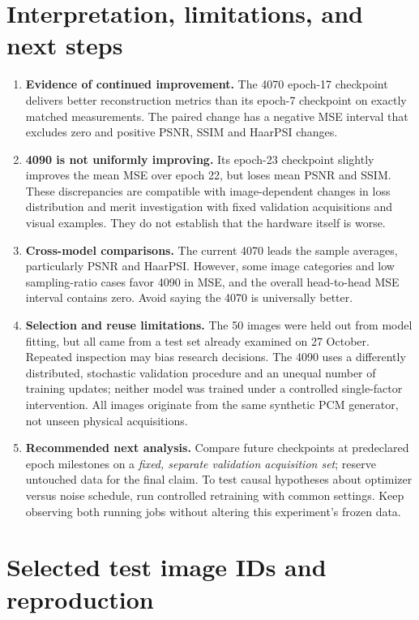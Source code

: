 \documentclass[11pt,a4paper]{article}
\begin{document}
\section{Interpretation, limitations, and next steps}
\begin{enumerate}[leftmargin=*]
\item \textbf{Evidence of continued improvement.} The 4070 epoch-17 checkpoint delivers better reconstruction metrics than its epoch-7 checkpoint on exactly matched measurements. The paired change has a negative MSE interval that excludes zero and positive PSNR, SSIM and HaarPSI changes.
\item \textbf{4090 is not uniformly improving.} Its epoch-23 checkpoint slightly improves the mean MSE over epoch 22, but loses mean PSNR and SSIM. These discrepancies are compatible with image-dependent changes in loss distribution and merit investigation with fixed validation acquisitions and visual examples. They do not establish that the hardware itself is worse.
\item \textbf{Cross-model comparisons.} The current 4070 leads the sample averages, particularly PSNR and HaarPSI. However, some image categories and low sampling-ratio cases favor 4090 in MSE, and the overall head-to-head MSE interval contains zero. Avoid saying the 4070 is universally better.
\item \textbf{Selection and reuse limitations.} The 50 images were held out from model fitting, but all came from a test set already examined on 27 October. Repeated inspection may bias research decisions. The 4090 uses a differently distributed, stochastic validation procedure and an unequal number of training updates; neither model was trained under a controlled single-factor intervention. All images originate from the same synthetic PCM generator, not unseen physical acquisitions.
\item \textbf{Recommended next analysis.} Compare future checkpoints at predeclared epoch milestones on a \emph{fixed, separate validation acquisition set}; reserve untouched data for the final claim. To test causal hypotheses about optimizer versus noise schedule, run controlled retraining with common settings. Keep observing both running jobs without altering this experiment's frozen data.
\end{enumerate}
\appendix\section{Selected test image IDs and reproduction}
\end{document}
